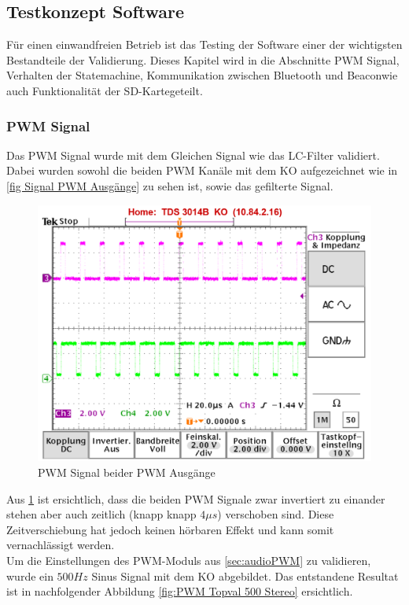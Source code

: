 \subsection{Testkonzept Software}\label{sec:testkonzeptSoftware}

Für einen einwandfreien Betrieb ist das Testing der Software einer der wichtigsten Bestandteile der Validierung. Dieses Kapitel wird in die Abschnitte \glqq PWM Signal\grqq, \glqq Verhalten der Statemachine\grqq, \glqq Kommunikation zwischen Bluetooth und Beacon\grqq wie auch \glqq Funktionalität der SD-Karte\grqq geteilt.

\subsubsection{PWM Signal}\label{sec: Validierung PWM Signal}
Das PWM Signal wurde mit dem Gleichen Signal wie das LC-Filter validiert. Dabei wurden sowohl die beiden PWM Kanäle mit dem KO aufgezeichnet wie in \ref{fig Signal PWM Ausgänge} zu sehen ist, sowie das gefilterte Signal. 

\begin{figure}[H]
	\begin{center}
		\includegraphics[width=120mm]{data/PWM_Signal_500Hz_Mono_mit_Infos.png}
		\caption[PWM Signal beider PWM Ausgänge]{PWM Signal beider PWM Ausgänge} %
		\label{fig:Signal PWM Ausgänge}
	\end{center}
\end{figure}


Aus \ref{fig:Signal PWM Ausgänge} ist ersichtlich, dass die beiden PWM Signale zwar invertiert zu einander stehen aber auch zeitlich (knapp knapp $4\mu s$) verschoben sind. Diese Zeitverschiebung hat jedoch keinen hörbaren Effekt und kann somit vernachlässigt werden.\\
Um die Einstellungen des PWM-Moduls aus \ref{sec:audioPWM} zu validieren, wurde ein $500Hz$ Sinus Signal mit dem KO abgebildet. Das entstandene Resultat ist in nachfolgender Abbildung \ref{fig:PWM Topval 500 Stereo} ersichtlich.


